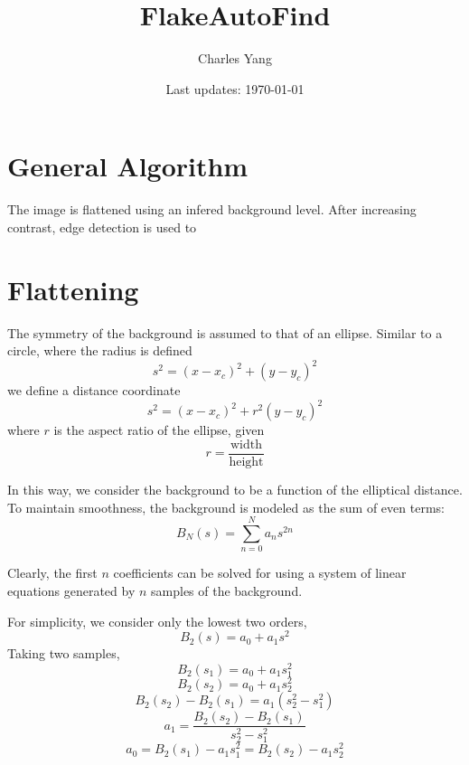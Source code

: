 \documentclass{article}
\title{FlakeAutoFind}
\author{Charles Yang}
\date{Last updates: \today}
\begin{document}
\maketitle

\setcounter{tocdepth}{1}
\tableofcontents

\section{General Algorithm}
The image is flattened using an infered background level. After increasing contrast, edge detection is used to 

\section{Flattening}
The symmetry of the background is assumed to that of an ellipse. Similar to a circle, where the radius is defined
\[s^2=(x-x_c)^2+(y-y_c)^2\]
we define a distance coordinate
\[s^2=(x-x_c)^2+r^2(y-y_c)^2\]
where \(r\) is the aspect ratio of the ellipse, given
\[r = \frac{\text{width}}{\text{height}}\]

In this way, we consider the background to be a function of the elliptical distance. To maintain smoothness, the background is modeled as the sum of even terms:
\[B_N(s)=\sum_{n=0}^N a_ns^{2n}\]

Clearly, the first \(n\) coefficients can be solved for using a system of linear equations generated by \(n\) samples of the background. 

For simplicity, we consider only the lowest two orders, 
\[B_2(s) = a_0+a_1s^2\]
Taking two samples,
\[B_2(s_1) = a_0+a_1s_1^2\]
\[B_2(s_2) = a_0+a_1s_2^2\]
\[B_2(s_2)-B_2(s_1)=a_1(s_2^2-s_1^2)\]
\[a_1=\frac{B_2(s_2)-B_2(s_1)}{s_2^2-s_1^2}\]
\[a_0=B_2(s_1)-a_1s_1^2=B_2(s_2)-a_1s_2^2\]
\end{document}

